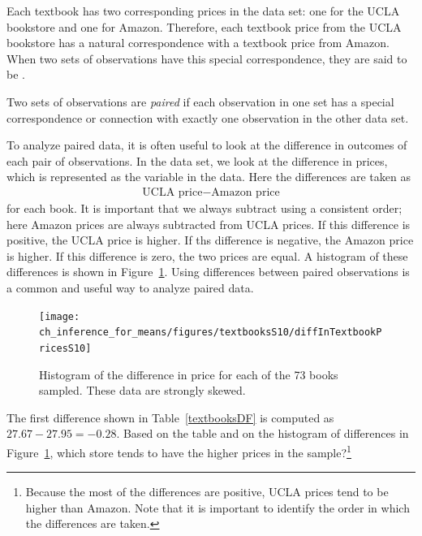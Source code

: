 Each textbook has two corresponding prices in the data set: one for the UCLA bookstore and one for Amazon. Therefore, each textbook price from the UCLA bookstore has a natural correspondence with a textbook price from Amazon. When two sets of observations have this special correspondence, they are said to be .

\begin{termBox}{
Two sets of observations are \emph{paired} if each observation in one set has a special correspondence or connection with exactly one observation in the other data set.}
\end{termBox}

To analyze paired data, it is often useful to look at the difference in outcomes of each pair of observations. In the  data set, we look at the difference in prices, which is represented as the  variable in the  data. Here the differences are taken as
\begin{eqnarray*}
\text{UCLA price} - \text{Amazon price}
\end{eqnarray*}
for each book. It is important that we always subtract using a consistent order; here Amazon prices are always subtracted from UCLA prices. If this difference is positive, the UCLA price is higher. If ths difference is negative, the Amazon price is higher. If this difference is zero, the two prices are equal. A histogram of these differences is shown in Figure~\ref{diffInTextbookPricesS10}. Using differences between paired observations is a common and useful way to analyze paired data.

\begin{figure}
\centering
\texttt{[image: ch\_inference\_for\_means/figures/textbooksS10/diffInTextbookPricesS10]}
\caption{Histogram of the difference in price for each of the 73 books sampled. These data are strongly skewed.}
\label{diffInTextbookPricesS10}
\end{figure}

\begin{exercise}
The first difference shown in Table~\ref{textbooksDF} is computed as $27.67-27.95=-0.28$. Based on the table and on the histogram of differences in Figure~\ref{diffInTextbookPricesS10}, which store tends to have the higher prices in the sample?\footnote{Because the most of the differences are positive, UCLA prices tend to be higher than Amazon. Note that it is important to identify the order in which the differences are taken.}
\end{exercise}



